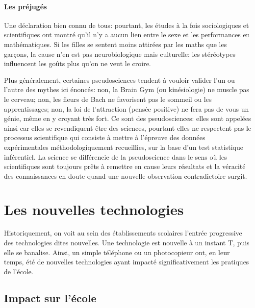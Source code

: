             \paragraph{Les préjugés}
                Une déclaration bien connu de tous:  pourtant, les études à la fois sociologiques et scientifiques ont montré qu’il n’y a aucun lien entre le sexe et les performances en mathématiques.
                Si les filles se sentent moins attirées par les maths que les garçons, la cause n’en est pas neurobiologique mais culturelle: les stéréotypes influencent les goûts plus qu’on ne veut le croire.\par%
                Plus généralement, certaines pseudosciences tendent à vouloir valider l'un ou l'autre des mythes ici énoncés: non, la Brain Gym (ou kinésiologie) ne muscle pas le cerveau; non, les fleurs de Bach ne favorisent pas le sommeil ou les apprentissages; non, la loi de l’attraction (pensée positive) ne fera pas de vous un génie, même en y croyant très fort. Ce sont des pseudosciences: elles sont appelées ainsi car elles se revendiquent être  des sciences, pourtant elles ne respectent pas le processus scientifique qui consiste à mettre à l’épreuve des données expérimentales méthodologiquement recueillies, sur la base d’un test statistique inférentiel. La science se différencie de la pseudoscience dans le sens où les scientifiques sont toujours prêts à remettre en cause leurs résultats et la véracité des connaissances en doute quand une nouvelle observation contradictoire surgit.
\section{Les nouvelles technologies}\label{sec:honeyBee}
    Historiquement, on voit au sein des établissements scolaires l'entrée progressive des technologies dites nouvelles. Une technologie est nouvelle à un instant T, puis elle se banalise. Ainsi, un simple téléphone ou un photocopieur ont, en leur temps, été de nouvelles technologies ayant impacté significativement les pratiques de l'école.
    \subsection{Impact sur l'école}
